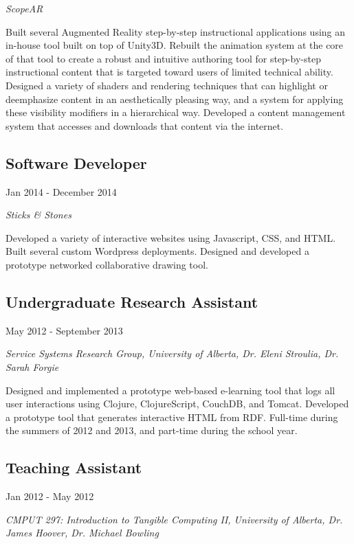 \documentclass[10pt]{article}
\begin{document}
\emph{ScopeAR}
\vspace{\baselineskip}

Built several Augmented Reality step-by-step instructional applications using an in-house tool built on top of Unity3D. Rebuilt the animation system at the core of that tool to create a robust and intuitive authoring tool for step-by-step instructional content that is targeted toward users of limited technical ability. Designed a variety of shaders and rendering techniques that can highlight or deemphasize content in an aesthetically pleasing way, and a system for applying these visibility modifiers in a hierarchical way. Developed a content management system that accesses and downloads that content via the internet.

\subsection*{Software Developer}
Jan 2014 - December 2014

\emph{Sticks \& Stones}
\vspace{\baselineskip}

Developed a variety of interactive websites using Javascript, CSS, and HTML. Built several custom Wordpress deployments. Designed and developed a prototype networked collaborative drawing tool.

\subsection*{Undergraduate Research Assistant}
May 2012 - September 2013

\emph{Service Systems Research Group, University of Alberta, Dr. Eleni Stroulia, Dr. Sarah Forgie}
\vspace{\baselineskip}

Designed and implemented a prototype web-based e-learning tool that logs all user interactions using Clojure, ClojureScript, CouchDB, and Tomcat. Developed a prototype tool that generates interactive HTML from RDF. Full-time during the summers of 2012 and 2013, and part-time during the school year.

\subsection*{Teaching Assistant}
Jan 2012 - May 2012

\emph{CMPUT 297: Introduction to Tangible Computing II, University of Alberta, Dr. James Hoover, Dr. Michael Bowling}
\vspace{\baselineskip}
\end{document}
